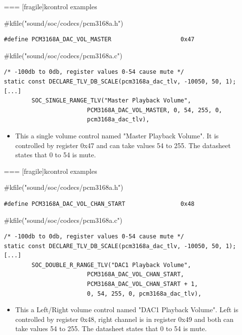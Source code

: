 === [fragile]{kcontrol examples}
  \begin{block}{#kfile("sound/soc/codecs/pcm3168a.h")}
    \fontsize{9}{9}\selectfont
    \begin{verbatim}
#define PCM3168A_DAC_VOL_MASTER                    0x47
    \end{verbatim}
  \end{block}
  \begin{block}{#kfile("sound/soc/codecs/pcm3168a.c")}
    \fontsize{9}{9}\selectfont
    \begin{verbatim}
/* -100db to 0db, register values 0-54 cause mute */
static const DECLARE_TLV_DB_SCALE(pcm3168a_dac_tlv, -10050, 50, 1);
[...]
        SOC_SINGLE_RANGE_TLV("Master Playback Volume",
                        PCM3168A_DAC_VOL_MASTER, 0, 54, 255, 0,
                        pcm3168a_dac_tlv),
    \end{verbatim}
  \end{block}
  \begin{itemize}
  \item This a single volume control named "Master Playback Volume".
    It is controlled by register 0x47 and can take values 54 to 255.
    The datasheet states that 0 to 54 is mute.
  \end{itemize}


=== [fragile]{kcontrol examples}
  \begin{block}{#kfile("sound/soc/codecs/pcm3168a.h")}
    \fontsize{9}{9}\selectfont
    \begin{verbatim}
#define PCM3168A_DAC_VOL_CHAN_START                0x48
    \end{verbatim}
  \end{block}
  \begin{block}{#kfile("sound/soc/codecs/pcm3168a.c")}
    \fontsize{9}{9}\selectfont
    \begin{verbatim}
/* -100db to 0db, register values 0-54 cause mute */
static const DECLARE_TLV_DB_SCALE(pcm3168a_dac_tlv, -10050, 50, 1);
[...]
        SOC_DOUBLE_R_RANGE_TLV("DAC1 Playback Volume",
                        PCM3168A_DAC_VOL_CHAN_START,
                        PCM3168A_DAC_VOL_CHAN_START + 1,
                        0, 54, 255, 0, pcm3168a_dac_tlv),
    \end{verbatim}
  \end{block}
  \begin{itemize}
  \item This a Left/Right volume control named "DAC1 Playback Volume".
    Left is controlled by register 0x48, right channel is in register
    0x49 and both can take values 54 to 255.
    The datasheet states that 0 to 54 is mute.
  \end{itemize}


